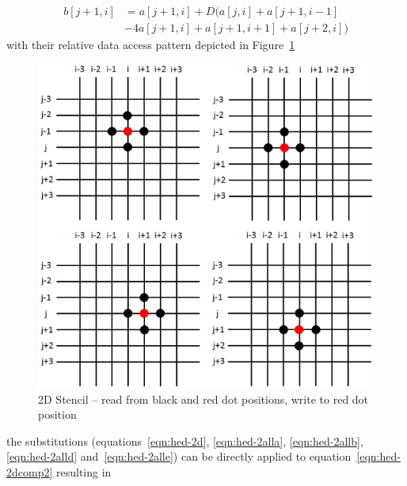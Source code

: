 \documentclass{acm_proc_article-sp}
\begin{document}
\begin{equation}
  \begin{split}
    b[j+1,i] &= a[j+1,i] + D(a[j,i] + a[j+1,i-1]\\
    &- 4a[j+1,i] + a[j+1,i+1] + a[j+2,i])
  \end{split}
  \label{eqn:hed-2alle}
\end{equation}
with their relative data access pattern depicted in Figure~\ref{pic:2d-s01}
\begin{figure}[ht!]
  \centering
  \includegraphics[scale=0.5]{pics/stencil_grid/2d-s01_all}
  \caption{2D Stencil -- read from black and red dot positions, write to red dot position}
  \label{pic:2d-s01}
\end{figure}
the substitutions (equations~\eqref{eqn:hed-2d}, \eqref{eqn:hed-2alla}, \eqref{eqn:hed-2allb}, \eqref{eqn:hed-2alld} and~\eqref{eqn:hed-2alle}) can be directly applied to equation~\eqref{eqn:hed-2dcomp2} resulting in
\end{document}
